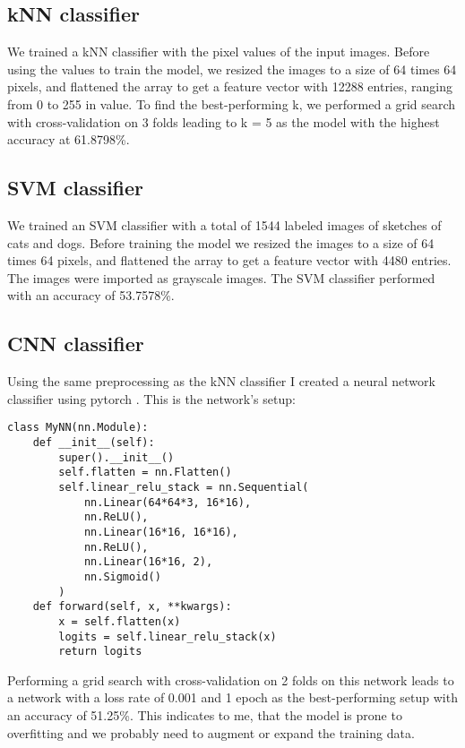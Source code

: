 \subsection*{kNN classifier}
We trained a kNN classifier with the pixel values of the input images. Before
using the values to train the model, we resized the images to a size of 64 times 
64 pixels, and flattened the array to get a feature vector with 12288 entries, 
ranging from 0 to 255 in value. To find the best-performing k, we performed a
grid search with cross-validation on 3 folds leading to k = 5 as the model with 
the highest accuracy at 61.8798\%.

\subsection*{SVM classifier}
We trained an SVM classifier with a total of 1544 labeled images of sketches of
cats and dogs. Before training the model we resized the images to a size of 64
times 64 pixels, and flattened the array to get a feature vector with 4480
entries. The images were imported as grayscale images. The SVM classifier
performed with an accuracy of 53.7578\%.


\subsection*{CNN classifier}
Using the same preprocessing as the kNN classifier I created a neural network
classifier using pytorch \textcite{pytorch}. This is the network's setup:

\begin{lstlisting}
class MyNN(nn.Module):
    def __init__(self):
        super().__init__()
        self.flatten = nn.Flatten()
        self.linear_relu_stack = nn.Sequential(
            nn.Linear(64*64*3, 16*16),
            nn.ReLU(),
            nn.Linear(16*16, 16*16),
            nn.ReLU(),
            nn.Linear(16*16, 2),
            nn.Sigmoid()
        )
    def forward(self, x, **kwargs):
        x = self.flatten(x)
        logits = self.linear_relu_stack(x)
        return logits
\end{lstlisting}

Performing a grid search with cross-validation on 2 folds on this network leads
to a network with a loss rate of 0.001 and 1 epoch as the best-performing setup
with an accuracy of 51.25\%. This indicates to me, that the model is prone to
overfitting and we probably need to augment or expand the training data.

